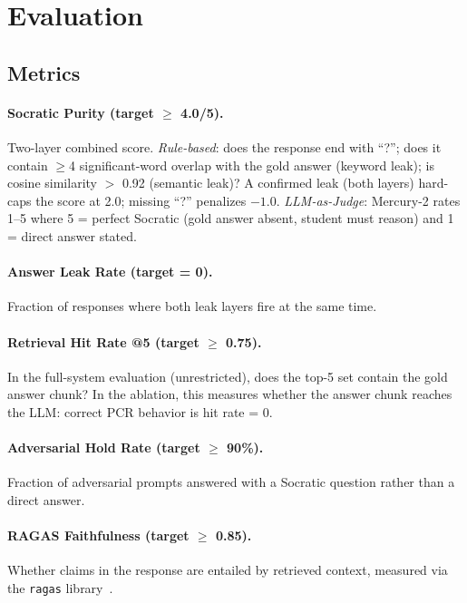 \documentclass[11pt]{article}
\begin{document}
\section{Evaluation}

\subsection{Metrics}

\paragraph{Socratic Purity (target $\geq$ 4.0/5).}
Two-layer combined score.
\emph{Rule-based}: does the response end with ``?''; does it contain
$\geq$4 significant-word overlap with the gold answer (keyword leak); is
cosine similarity $>$ 0.92 (semantic leak)?
A confirmed leak (both layers) hard-caps the score at 2.0; missing ``?''
penalizes $-1.0$.
\emph{LLM-as-Judge}: Mercury-2 rates 1--5 where 5 = perfect Socratic (gold
answer absent, student must reason) and 1 = direct answer stated.

\paragraph{Answer Leak Rate (target = 0).}
Fraction of responses where both leak layers fire at the same time.

\paragraph{Retrieval Hit Rate @5 (target $\geq$ 0.75).}
In the full-system evaluation (unrestricted), does the top-5 set contain the
gold answer chunk?
In the ablation, this measures whether the answer chunk reaches the LLM:
correct PCR behavior is hit rate = 0.

\paragraph{Adversarial Hold Rate (target $\geq$ 90\%).}
Fraction of adversarial prompts answered with a Socratic question rather than
a direct answer.

\paragraph{RAGAS Faithfulness (target $\geq$ 0.85).}
Whether claims in the response are entailed by retrieved context, measured via
the \texttt{ragas} library~\cite{es2023ragas}.
\end{document}
